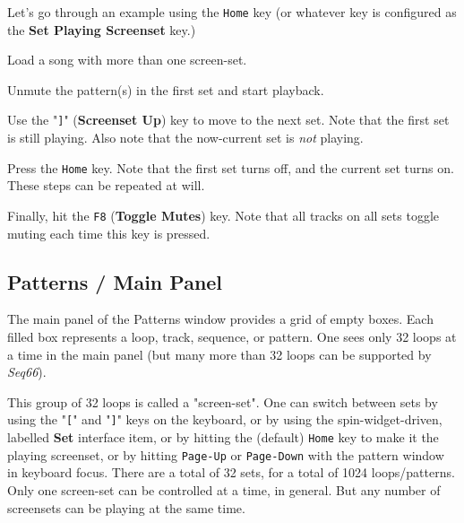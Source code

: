   Let's go through an example using the \texttt{Home} key (or whatever key is
   configured as the \textbf{Set Playing Screenset} key.)

   \begin{enumber}
      \item Load a song with more than one screen-set.
      \item Unmute the pattern(s) in the first set and start playback.
      \item Use the "\texttt{]}" (\textbf{Screenset Up}) key to move to the next
         set.  Note that the first set is still playing.  Also note that the
         now-current set is \textsl{not} playing.
      \item Press the \texttt{Home} key.
         Note that the first set turns off, and the current set turns on.
         These steps can be repeated at will.
      \item Finally, hit the \texttt{F8} (\textbf{Toggle Mutes}) key.
         Note that all tracks on all sets toggle muting each time this key is
         pressed.
   \end{enumber}

\subsection{Patterns / Main Panel}
\label{subsec:patterns_panel_main}

   The main panel of the Patterns window provides a grid of empty boxes.
   Each filled box represents a loop, track, sequence, or pattern.
   One sees only 32 loops at a time in the main panel (but many more than
   32 loops can be supported by \textsl{Seq66}).

   This group of 32 loops is called a "screen-set".
   One can switch between sets by using the
   \index{keys![}
   "\texttt{[}" and
   \index{keys!]}
   "\texttt{]}" keys on the keyboard, or by using
   the spin-widget-driven, labelled \textbf{Set} interface item, or
   by hitting the (default) \texttt{Home} key to make it the playing screenset,
   or by hitting \texttt{Page-Up} or \texttt{Page-Down} with the pattern window
   in keyboard focus.
   There are a total of 32 sets, for a total of 1024 loops/patterns. 
   Only one screen-set can be controlled at a time, in general.
   But any number of screensets can be playing at the same time.


